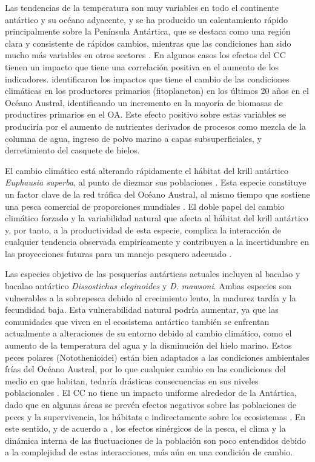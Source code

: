 \documentclass{sydneythesis}
\begin{document}
Las tendencias de la temperatura son muy variables en todo el continente antártico y su océano adyacente, y se ha producido un calentamiento rápido principalmente sobre la Península Antártica, que se destaca como una región clara y consistente de rápidos cambios, mientras que las condiciones han sido mucho más variables en otros sectores \autocite{Turner2005}. En algunos casos los efectos del CC tienen un impacto que tiene una correlación positiva en el aumento de los indicadores. \autocite{Pinkerton2021} identificaron los impactos que tiene el cambio de las condiciones climáticas en los productores primarios (fitoplancton) en los últimos 20 años en el Océano Austral, identificando un incremento en la mayoría de biomasas de productires primarios en el OA. Este efecto positivo sobre estas variables se produciría por el aumento de nutrientes derivados de procesos como mezcla de la columna de agua, ingreso de polvo marino a capas subsuperficiales, y derretimiento del casquete de hielos.

El cambio climático está alterando rápidamente el hábitat del krill antártico \emph{Euphausia superba}, al punto de diezmar sus poblaciones \autocite{Kruger2021}. Esta especie constituye un factor clave de la red trófica del Océano Austral, al mismo tiempo que sostiene una pesca comercial de proporciones mundiales \autocite{Atkinson2009}. El doble papel del cambio climático forzado y la variabilidad natural que afecta al hábitat del krill antártico y, por tanto, a la productividad de esta especie, complica la interacción de cualquier tendencia observada empirícamente y contribuyen a la incertidumbre en las proyecciones futuras para un manejo pesquero adecuado \autocite{Sylvester2021}.

Las especies objetivo de las pesquerías antárticas actuales incluyen al bacalao y bacalao antártico \emph{Dissostichus eleginoides} y \emph{D. mawsoni}. Ambas especies son vulnerables a la sobrepesca debido al crecimiento lento, la madurez tardía y la fecundidad baja. Esta vulnerabilidad natural podría aumentar, ya que las comunidades que viven en el ecosistema antártico también se enfrentan actualmente a alteraciones de su entorno debido al cambio climático, como el aumento de la temperatura del agua y la disminución del hielo marino. Estos peces polares (Notothenioidei) están bien adaptados a las condiciones ambientales frías del Océano Austral, por lo que cualquier cambio en las condiciones del medio en que habitan, tednría drásticas consecuencias en sus niveles poblacionales \autocite{Mintenbeck2017}. El CC no tiene un impacto uniforme alrededor de la Antártica, dado que en algunas áreas se prevén efectos negativos sobre las poblaciones de peces y la supervivencia, los hábitats e indirectamente sobre los ecosistemas \autocite{Vanderhaven2013}. En este sentido, y de acuerdo a \autocite{Hidalgo2011}, los efectos sinérgicos de la pesca, el clima y la dinámica interna de las fluctuaciones de la población son poco entendidos debido a la complejidad de estas interacciones, más aún en una condición de cambio.
\end{document}
